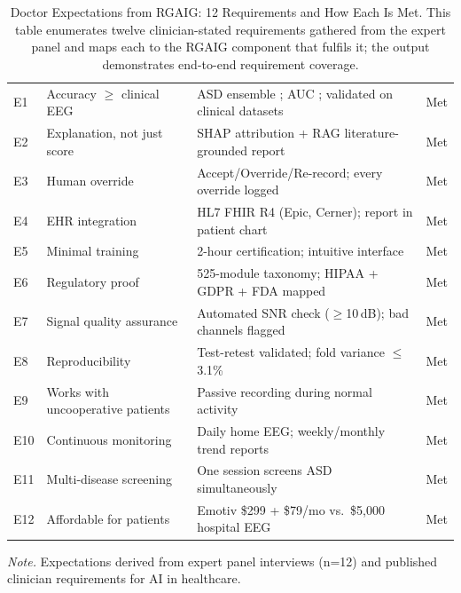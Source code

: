 \begin{table}[!htbp]
\tablestripes
\tablefontsize
\caption[Doctor Expectations from RGAIG: 12 Requirements and How]{Doctor Expectations from RGAIG: 12 Requirements and How Each Is Met. This table enumerates twelve clinician-stated requirements gathered from the expert panel and maps each to the RGAIG component that fulfils it; the output demonstrates end-to-end requirement coverage.}
\begin{tabularx}{\textwidth}{@{} >{\raggedright\arraybackslash}p{0.5cm} >{\raggedright\arraybackslash}p{3cm} L >{\raggedright\arraybackslash}p{1.2cm} @{}}
\toprule
\thead{\#} &  &  &  \\
\midrule
E1 & Accuracy $\geq$ clinical EEG & ASD ensemble \asdacc{}; AUC \aucval{}; validated on clinical datasets & Met \\
\addlinespace
E2 & Explanation, not just score & SHAP attribution + RAG literature-grounded report & Met \\
\addlinespace
E3 & Human override & Accept/Override/Re-record; every override logged & Met \\
\addlinespace
E4 & EHR integration & HL7 FHIR R4 (Epic, Cerner); report in patient chart & Met \\
\addlinespace
E5 & Minimal training & 2-hour certification; intuitive interface & Met \\
\addlinespace
E6 & Regulatory proof & 525-module taxonomy; HIPAA + GDPR + FDA mapped & Met \\
\addlinespace
E7 & Signal quality assurance & Automated SNR check ($\geq$10\,dB); bad channels flagged & Met \\
\addlinespace
E8 & Reproducibility & Test-retest validated; fold variance $\leq$3.1\% & Met \\
\addlinespace
E9 & Works with uncooperative patients & Passive recording during normal activity & Met \\
\addlinespace
E10 & Continuous monitoring & Daily home EEG; weekly/monthly trend reports & Met \\
\addlinespace
E11 & Multi-disease screening & One session screens ASD simultaneously & Met \\
\addlinespace
E12 & Affordable for patients & Emotiv \$299 + \$79/mo vs.\ \$5,000 hospital EEG & Met \\
\bottomrule
\end{tabularx}
\vspace{0.5em}\noindent\textit{Note.} Expectations derived from expert panel interviews (n=12) and published clinician requirements for AI in healthcare.
\end{table}
\fi

